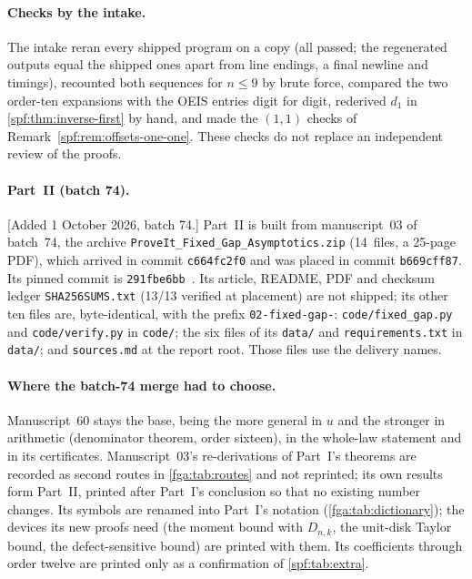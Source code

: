 \documentclass[11pt]{article}
\numberwithin{equation}{section}
\theoremstyle{definition}
\theoremstyle{remark}
\theoremstyle{definition}
\begin{document}
\paragraph{Checks by the intake.}
The intake reran every shipped program on a copy (all passed; the
regenerated outputs equal the shipped ones apart from line endings, a final
newline and timings), recounted both sequences for $n\le9$ by brute force,
compared the two order-ten expansions with the OEIS entries digit for digit,
rederived $d_1$ in \cref{spf:thm:inverse-first} by hand, and made the
$(1,1)$ checks of Remark~\ref{spf:rem:offsets-one-one}. These checks do not
replace an independent review of the proofs.

\paragraph{Part~II (batch 74).}
[Added 1 October 2026, batch 74.] Part~II is built from manuscript~03 of
batch~74, the archive \nolinkurl{ProveIt_Fixed_Gap_Asymptotics.zip}
(14~files, a 25-page PDF), which arrived in commit \texttt{c664fc2f0} and
was placed in commit \texttt{b669cff87}. Its pinned commit is
\texttt{291fbe6bb}~\cite{fgaProveIt}. Its article, README, PDF and checksum
ledger \texttt{SHA256SUMS.txt} (13/13 verified at placement) are not
shipped; its other ten files are, byte-identical, with the prefix
\texttt{02-fixed-gap-}: \texttt{code/fixed\_gap.py} and
\texttt{code/verify.py} in \texttt{code/}; the six files of its
\texttt{data/} and \texttt{requirements.txt} in \texttt{data/}; and
\texttt{sources.md} at the report root. Those files use the delivery names.

\paragraph{Where the batch-74 merge had to choose.} Manuscript~60 stays the
base, being the more general in $u$ and the stronger in arithmetic
(denominator theorem, order sixteen), in the whole-law statement and in
its certificates. Manuscript~03's re-derivations of Part~I's theorems are
recorded as second routes in \cref{fga:tab:routes} and not reprinted; its
own results form Part~II, printed after Part~I's conclusion so that no
existing number changes. Its symbols are renamed into Part~I's notation
(\cref{fga:tab:dictionary}); the devices its new proofs need (the moment
bound with $D_{n,k}$, the unit-disk Taylor bound, the defect-sensitive
bound) are printed with them. Its coefficients through order twelve are
printed only as a confirmation of \cref{spf:tab:extra}.
\end{document}
